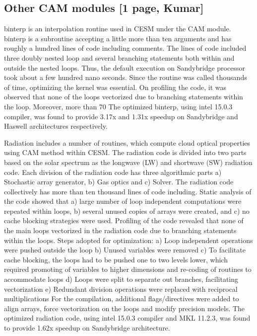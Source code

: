 \subsection{Other CAM modules [1 page, Kumar]}\label{sec:other}

binterp is an interpolation routine used in CESM under the CAM module. binterp is a subroutine accepting a little more than ten arguments and has roughly a hundred lines of code including comments. The  lines of code included three doubly nested loop and several branching statements both within and outside the nested loops. Thus, the default execution on Sandybridge processor took about a few hundred nano seconds. Since the routine was called thousands of time, optimizing the kernel was essential.
On profiling the code, it was observed that none of the loops vectorized due to branching statements within the loop. Moreover, more than 70%
The optimized binterp, using intel 15.0.3 compiler, was found to provide 3.17x and 1.31x speedup on Sandybridge and Haswell architectures respectively. 

Radiation includes a number of routines, which compute cloud optical properties using CAM method within CESM. The radiation code is divided into two parts based on the solar spectrum as the longwave (LW) and shortwave (SW) radiation code. Each division of the radiation code has three algorithmic parts a) Stochastic array generator, b) Gas optics and c) Solver. The radiation code collectively has more than ten thousand lines of code including. Static analysis of the code showed that a) large number of loop independent computations were repeated within loops, b) several unused copies of arrays were created, and c) no cache blocking strategies were used. 
Profiling of the code revealed that none of the main loops vectorized in the radiation code due to branching statements within the loops. Steps adopted for optimization:
a) Loop independent operations were pushed outside the loop
b) Unused variables were removed
c) To facilitate cache blocking, the loops had to be pushed one to two levels lower, which required promoting of variables to higher dimensions and re-coding of routines to accommodate loops
d) Loops were split to separate out branches, facilitating vectorization
e) Redundant division operations were replaced with reciprocal multiplications
For the compilation, additional flags/directives were added to align arrays, force vectorization on the loops and modify precision models. 
The optimized radiation code, using intel 15.0.3 compiler and MKL 11.2.3, was found to provide 1.62x speedup on Sandybridge architecture. 


